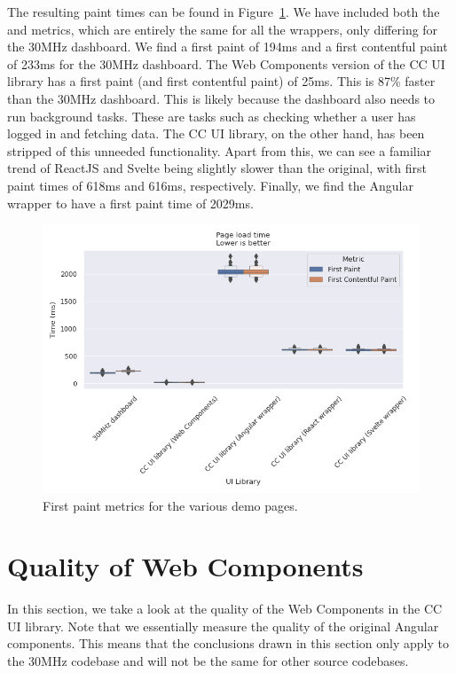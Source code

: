 The resulting paint times can be found in Figure~\ref{fig:results:first-paint}. We have included both the  and  metrics, which are entirely the same for all the wrappers, only differing for the 30MHz dashboard. We find a first paint of 194ms and a first contentful paint of 233ms for the 30MHz dashboard. The Web Components version of the CC UI library has a first paint (and first contentful paint) of 25ms. This is 87\% faster than the 30MHz dashboard. This is likely because the dashboard also needs to run background tasks. These are tasks such as checking whether a user has logged in and fetching data. The CC UI library, on the other hand, has been stripped of this unneeded functionality. Apart from this, we can see a familiar trend of ReactJS and Svelte being slightly slower than the original, with first paint times of 618ms and 616ms, respectively. Finally, we find the Angular wrapper to have a first paint time of 2029ms.

\begin{figure}[htbp]
  \includegraphics[width=\columnwidth]{plots/first-contentful-paint.png}
  \caption{First paint metrics for the various demo pages.}
  \label{fig:results:first-paint}
  \centering
\end{figure}

\section{Quality of Web Components}
In this section, we take a look at the quality of the Web Components in the CC UI library. Note that we essentially measure the quality of the original Angular components. This means that the conclusions drawn in this section only apply to the 30MHz codebase and will not be the same for other source codebases.

